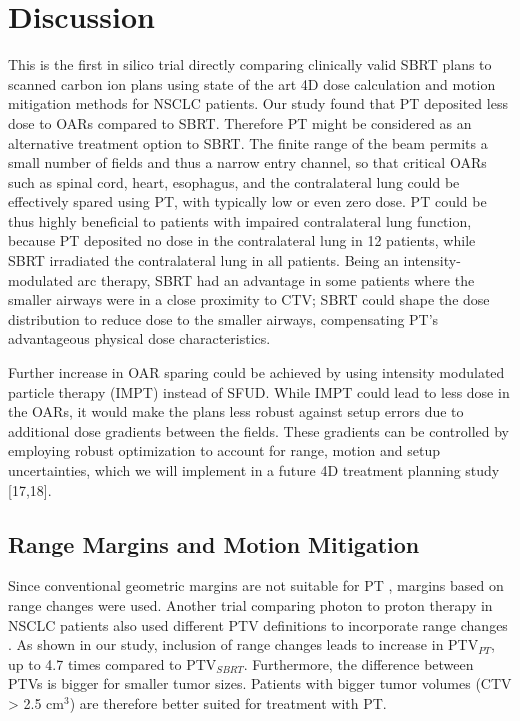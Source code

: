 \documentclass[type=dr, dr=rernat, acm$^3$entcolor=tud7b,colorbacktitle, bigchapter, openright, twoside, 12pt ]{tudthesis}
\begin{document}
\section{Discussion}

This is the first in silico trial directly comparing clinically valid SBRT plans to scanned carbon ion plans using state of the art 4D dose calculation and motion mitigation methods for NSCLC patients. Our study found that PT deposited less dose to OARs compared to SBRT. Therefore PT might be considered as an alternative treatment option to SBRT. The finite range of the beam permits a small number of fields and thus a narrow entry channel, so that critical OARs such as spinal cord, heart, esophagus, and the contralateral lung could be effectively spared using PT, with typically low or even zero dose. PT could be thus highly beneficial to patients with impaired contralateral lung function, because PT deposited no dose in the contralateral lung in 12 patients, while SBRT irradiated the contralateral lung in all patients. Being an intensity-modulated arc therapy, SBRT had an advantage in some patients where the smaller airways were in a close proximity to CTV; SBRT could shape the dose distribution to reduce dose to the smaller airways, compensating PT’s advantageous physical dose characteristics.

Further increase in OAR sparing could be achieved by using intensity modulated particle therapy (IMPT) instead of SFUD. While IMPT could lead to less dose in the OARs, it would make the plans less robust against setup errors due to additional dose gradients between the fields. These gradients can be controlled by employing robust optimization to account for range, motion and setup uncertainties, which we will implement in a future 4D treatment planning study \cite{Chen2012}[17,18].



\subsection{Range Margins and Motion Mitigation}

Since conventional geometric margins are not suitable for PT \cite{Park2012}, margins based on range changes were used. Another trial comparing photon to proton therapy in NSCLC patients also used different PTV definitions to incorporate range changes  \cite{Roelofs2012}. As shown in our study, inclusion of range changes leads to increase in PTV$_{PT}$, up to 4.7 times compared to PTV$_{SBRT}$. Furthermore, the difference between PTVs is bigger for smaller tumor sizes. Patients with bigger tumor volumes (CTV > 2.5 cm$^{3}$) are therefore better suited for treatment with PT. 
\end{document}
